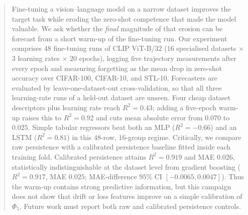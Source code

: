 \documentclass[manuscript,nonacm]{acmart}
\begin{document}
\begin{abstract}
Fine-tuning a vision--language model on a narrow dataset improves the target task while
eroding the zero-shot competence that made the model valuable. We ask whether the
\emph{final} magnitude of that erosion can be forecast from a short warm-up of the
fine-tuning run. Our experiment comprises $48$ fine-tuning runs of CLIP ViT-B/32
($16$ specialised datasets $\times$ $3$ learning rates $\times$ $20$ epochs), logging
five trajectory measurements after every epoch and measuring forgetting as the mean drop in
zero-shot accuracy over CIFAR-100, CIFAR-10, and STL-10. Forecasters are evaluated by
leave-one-dataset-out cross-validation, so that all three learning-rate runs of a
held-out dataset are unseen. Four cheap dataset descriptors plus learning rate reach
$R^2=0.43$; adding a five-epoch warm-up raises this to $R^2=0.92$ and cuts mean absolute
error from $0.070$ to $0.025$. Simple tabular regressors beat both an MLP
($R^2=-0.66$) and an LSTM ($R^2=0.81$) in this $48$-row, $16$-group regime. Critically,
we compare raw persistence with a calibrated persistence baseline fitted inside each
training fold. Calibrated persistence attains $R^2=0.919$ and MAE $0.026$, statistically
indistinguishable at the dataset level from gradient boosting ($R^2=0.917$, MAE $0.025$;
MAE-difference $95\%$ CI $[-0.0065,0.0047]$). Thus the warm-up contains strong predictive
information, but this campaign does not show that drift or loss features improve on a
simple calibration of $\Phi_5$. Future work must report both raw and calibrated
persistence controls.
\end{abstract}



\maketitle

\end{document}
